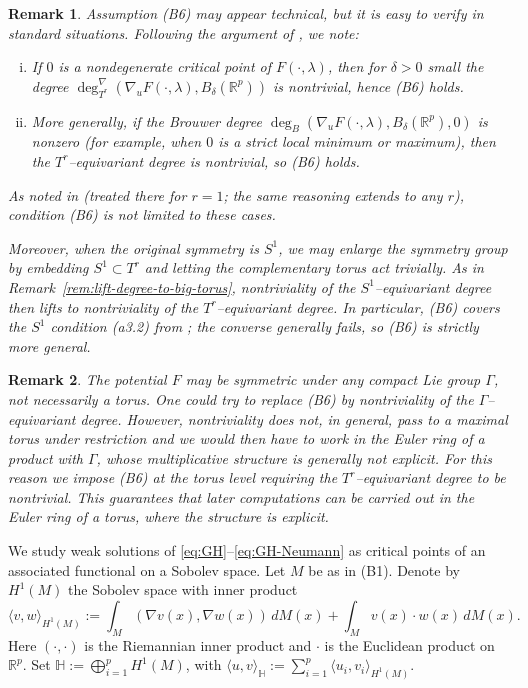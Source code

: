 \documentclass[reqno,twoside,12pt]{amsart}
\newtheorem{Remark}{Remark}[section]
\newcommand{\bH}{\mathbb{H}}
\newcommand{\bR}{\mathbb{R}}
\numberwithin{equation}{section} \errorcontextlines=0
\begin{document}
\begin{Remark}\label{rem:B6}
Assumption \textnormal{(B6)} may appear technical, but it is easy to verify in standard situations. Following the argument of \cite[Remark~4.1]{GolRybSte2025}, we note:
\begin{enumerate}[(i)]
\item If $0$ is a nondegenerate critical point of $F(\cdot,\lambda)$, then for $\delta>0$ small the degree
$\deg^{\nabla}_{T^{r}} (\nabla_{u}F(\cdot,\lambda),B_{\delta}(\mathbb{R}^{p}) )$
is nontrivial, hence \textnormal{(B6)} holds.
\item More generally, if the Brouwer degree $\deg_{B} (\nabla_{u}F(\cdot,\lambda),B_{\delta}(\mathbb{R}^{p}),0 )$ is nonzero (for example, when $0$ is a strict local minimum or maximum), then the $T^{r}$–equivariant degree is nontrivial, so \textnormal{(B6)} holds.
\end{enumerate}
As noted in \cite[Remark~4.3]{GolRybSte2025} (treated there for $r=1$; the same reasoning extends to any $r$), condition \textnormal{(B6)} is not limited to these cases.

Moreover, when the original symmetry is $S^{1}$, we may enlarge the symmetry group by embedding $S^{1}\subset T^{r}$ and letting the complementary torus act trivially. As in Remark~\ref{rem:lift-degree-to-big-torus}, nontriviality of the $S^{1}$–equivariant degree then lifts to nontriviality of the $T^{r}$–equivariant degree. In particular, \textnormal{(B6)} covers the $S^{1}$ condition \textnormal{(a3.2)} from \cite{GolRybSte2025}; the converse generally fails, so \textnormal{(B6)} is strictly more general.
\end{Remark}

\begin{Remark}
The potential $F$ may be symmetric under any compact Lie group $\Gamma$, not necessarily a torus. One could try to replace \textnormal{(B6)} by nontriviality of the $\Gamma$–equivariant degree. However, nontriviality does not, in general, pass to a maximal torus under restriction and we would then have to work in the Euler ring of a product with $\Gamma$, whose multiplicative structure is generally not explicit.
For this reason we impose \textnormal{(B6)} at the torus level requiring the $T^{r}$–equivariant degree to be nontrivial. This guarantees that later computations can be carried out in the Euler ring of a torus, where the structure is explicit.
\end{Remark}

We study weak solutions of \eqref{eq:GH}--\eqref{eq:GH-Neumann} as critical points of an associated functional on a Sobolev space.
Let $M$ be as in (B1). Denote by $H^{1}(M)$ the Sobolev space with inner product
\[
\langle v,w\rangle_{H^{1}(M)}:=\int_{M} (\nabla v(x),\nabla w(x))\,dM(x)+\int_{M} v(x)\cdot w(x)\,dM(x).
\]
Here $(\cdot,\cdot)$ is the Riemannian inner product and $\cdot$ is the Euclidean product on $\bR^p$. Set
$\bH:=\bigoplus_{i=1}^{p}H^{1}(M)$, with
$\langle u,v\rangle_{\bH}:=\sum_{i=1}^{p}\langle u_{i},v_{i}\rangle_{H^{1}(M)}$.
\end{document}
